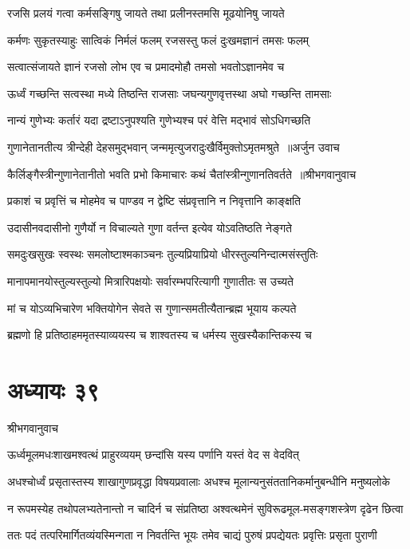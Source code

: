 \twolineshloka
{रजसि प्रलयं गत्वा कर्मसङ्गिषु जायते}
{तथा प्रलीनस्तमसि मूढयोनिषु जायते}


\twolineshloka
{कर्मणः सुकृतस्याहुः सात्विकं निर्मलं फलम्}
{रजसस्तु फलं दुःखमज्ञानं तमसः फलम्}


\twolineshloka
{सत्वात्संजायते ज्ञानं रजसो लोभ एव च}
{प्रमादमोहौ तमसो भवतोऽज्ञानमेव च}


\twolineshloka
{ऊर्ध्वं गच्छन्ति सत्वस्था मध्ये तिष्ठन्ति राजसाः}
{जघन्यगुणवृत्तस्था अघो गच्छन्ति तामसाः}


\twolineshloka
{नान्यं गुणेभ्यः कर्तारं यदा द्रष्टाऽनुपश्यति}
{गुणेभ्यश्च परं वेत्ति मद्भावं सोऽधिगच्छति}


\threelineshloka
{गुणानेतानतीत्य त्रीन्देही देहसमुद्भवान्}
{जन्ममृत्युजरादुःखैर्विमुक्तोऽमृतमश्रुते ॥अर्जुन उवाच}
{}


\threelineshloka
{कैर्लिङ्गैस्त्रीन्गुणानेतानीतो भवति प्रभो}
{किमाचारः कथं चैतांस्त्रीन्गुणानतिवर्तते ॥श्रीभगवानुवाच}
{}


\twolineshloka
{प्रकाशं च प्रवृत्तिं च मोहमेव च पाण्डव}
{न द्वेष्टि संप्रवृत्तानि न निवृत्तानि काङ्क्षति}


\twolineshloka
{उदासीनवदासीनो गुणैर्यो न विचाल्यते}
{गुणा वर्तन्त इत्येव योऽवतिष्ठति नेङ्गते}


\twolineshloka
{समदुःखसुखः स्वस्थः समलोष्टाश्मकाञ्चनः}
{तुल्यप्रियाप्रियो धीरस्तुल्यनिन्दात्मसंस्तुतिः}


\twolineshloka
{मानापमानयोस्तुल्यस्तुल्यो मित्रारिपक्षयोः}
{सर्वारम्भपरित्यागी गुणातीतः स उच्यते}


\twolineshloka
{मां च योऽव्यभिचारेण भक्तियोगेन सेवते}
{स गुणान्समतीत्यैतान्ब्रह्म भूयाय कल्पते}


\twolineshloka
{ब्रह्मणो हि प्रतिष्ठाहममृतस्याव्ययस्य च}
{शाश्वतस्य च धर्मस्य सुखस्यैकान्तिकस्य च}


\chapter{अध्यायः ३९}
\twolineshloka
{श्रीभगवानुवाच}
{}


\twolineshloka
{ऊर्ध्वमूलमधःशाखमश्वत्थं प्राहुरव्ययम्}
{छन्दांसि यस्य पर्णानि यस्तं वेद स वेदवित्}


\twolineshloka
{अधश्चोर्ध्वं प्रसृतास्तस्य शाखागुणप्रवृद्धा विषयप्रवालाः}
{अधश्च मूलान्यनुसंततानिकर्मानुबन्धीनि मनुष्यलोके}


\twolineshloka
{न रूपमस्येह तथोपलभ्यतेनान्तो न चादिर्न च संप्रतिष्ठा}
{अश्वत्थमेनं सुविरूढमूल-मसङ्गशस्त्रेण दृढेन छित्वा}


\twolineshloka
{ततः पदं तत्परिमार्गितव्यंयस्मिन्गता न निवर्तन्ति भूयः}
{तमेव चाद्यं पुरुषं प्रपद्येयतः प्रवृत्तिः प्रसृता पुराणी}


